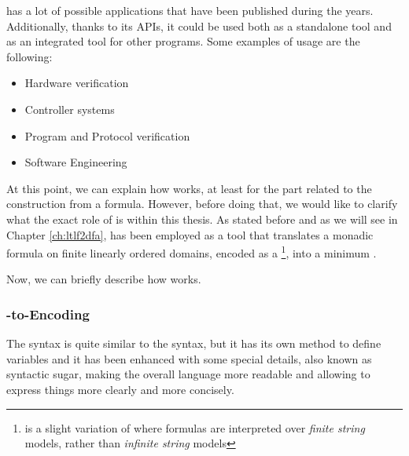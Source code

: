\MONA has a lot of possible applications that have been published during the years. Additionally, thanks to its APIs, it could be used both as a standalone tool and as an integrated tool for other programs. Some examples of \MONA usage are the following:
\begin{itemize}
\item Hardware verification
\item Controller systems
\item Program and Protocol verification
\item Software Engineering
\end{itemize}

At this point, we can explain how \MONA works, at least for the part related to the \DFA construction from a \FOL formula. However, before doing that, we would like to clarify what the exact role of \MONA is within this thesis. As stated before and as we will see in Chapter \ref{ch:ltlf2dfa}, \MONA has been employed as a tool that translates a monadic \FOL formula on finite linearly ordered domains, encoded as a \mls\footnote{\mls is a slight variation of \wsos where  formulas are interpreted over \emph{finite string} models, rather than \emph{infinite string} models}, into a minimum \DFA.

Now, we can briefly describe how \MONA works.

\subsubsection{\FOL-to-\MONA Encoding}
The \MONA syntax is quite similar to the \wsos syntax, but it has its own method to define variables and it has been enhanced with some special details, also known as syntactic sugar, making the overall language more readable and allowing to express things more clearly and more concisely.


